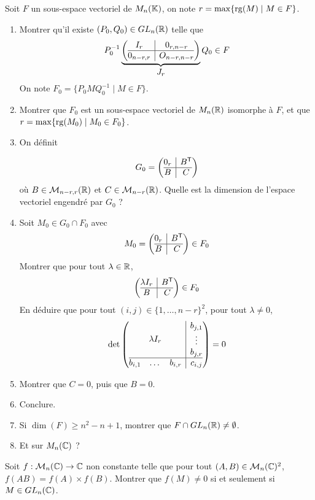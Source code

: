 \begin{exercise}
	Soit $F$ un sous-espace vectoriel de $M_{n}(\mathbb{K})$, on note $r=\max\{\operatorname{rg}(M)\mid
	M\in F \}$.
	\begin{enumerate}
		\item
		Montrer qu'il existe $(P_{0},Q_{0})\in GL_{n}(\mathbb{R})$ telle que 
		$$
		P_{0}^{-1}
		\underbrace{
			\left(
				\begin{array}{@{}c|c@{}}
					I_{r}
					& 0_{r,n-r} \\
					\hline
					0_{n-r,r} &
					O_{n-r,n-r}
				\end{array}\right)
		}_{\displaystyle J_{r}}
		Q_{0}\in F
		$$
		On note $F_{0}=\{P_{0}MQ_{0}^{-1}\mid M\in F\}$.
		\item
		Montrer que $F_{0}$ est un sous-espace vectoriel de $M_{n}(\mathbb{R})$ isomorphe
		à $F$, et que \\$r=\max\{\operatorname{rg}(M_{0})\mid M_{0}\in F_{0}\}$.
		\item
		On définit
		
		$$G_{0}= \left(
				\begin{array}{@{}c|c@{}}
					0_{r}
					& B^{\mathsf{T}} \\
					\hline
					B & C \end{array}\right)
		$$
		où $B\in\mathcal{M}_{n-r,r}(\mathbb{R})$ et $C\in\mathcal{M}_{n-r}(\mathbb{R})$. 
		Quelle est la dimension de l'espace vectoriel engendré par $G_{0}$ ?
		\item Soit $M_{0}\in G_{0}\cap F_{0}$ avec 
		$$
			M_{0}= \left(
				\begin{array}{@{}c|c@{}}
					0_{r}
					& B^{\mathsf{T}} \\
					\hline
					B & C
				\end{array}
			\right)
			\in
			F_{0}
		$$
		Montrer que pour tout $\lambda\in\mathbb{R}$,
		$$
			\left(
				\begin{array}{@{}c|c@{}}
				\lambda
				I_{r} & B^{\mathsf{T}} \\
					\hline
					B & C
				\end{array}
			\right)
			\in
			F_{0}
		$$
		En déduire que pour tout $(i,j)\in\{1,\dots, n-r\}^{2}$, pour tout $\lambda\neq0$,
		$$
		\det\left(
				\begin{array}{@{}c|c@{}}
				\lambda
				I_{r} &
				\begin{matrix}
				b_{j,1}\\
						\vdots\\
						b_{j,r}
						\end{matrix}
						\\
					\hline
					\begin{matrix}
						b_{i,1} &
						\dots
						& b_{i,r}
						\end{matrix}
						& c_{i,j}
				\end{array}
			\right)=0
		$$
		\item Montrer que $C=0$, puis que $B=0$.
		\item Conclure.
		\item Si $\dim(F)\geqslant n^{2}-n+1$, montrer que $F\cap GL_{n}(\mathbb{R})\neq\emptyset$.
		\item Et sur $M_{n}(\mathbb{C})$ ?
	\end{enumerate}
\end{exercise}

\begin{exercise}
	Soit $f:\mathcal{M}_{n}(\mathbb{C})\to\mathbb{C}$ non constante telle que pour tout $(A,B)\in\mathcal{M}_{n}(\mathbb{C})^{2}$, $f(AB)=f(A)\times f(B)$. 
	Montrer que $f(M)\neq0$ si et seulement si $M\in GL_{n}(\mathbb{C})$.
\end{exercise}